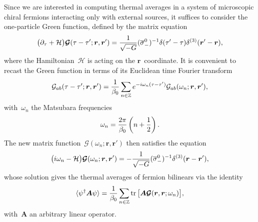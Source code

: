 \documentclass[11pt,a4paper]{article}
\begin{document}
Since we are interested in computing
thermal averages in a system of microscopic chiral fermions interacting only with external sources, 
it suffices to consider the one-particle Green function, defined by the matrix equation
\begin{align}
\big(\partial_{\tau}+\mathcal{H}\big)\boldsymbol{\mathcal{G}}(\tau-\tau';\boldsymbol{r},\boldsymbol{r}')=
{1\over \sqrt{-G}}(\overline{\sigma}_{-}^{0})^{-1}
\delta(\tau'-\tau)\delta^{(3)}(\boldsymbol{r}'-\boldsymbol{r}),
\label{eq:green_function_def}
\end{align}
where the Hamiltonian~$\mathcal{H}$ is acting on the $\boldsymbol{r}$~coordinate. 
It is convenient to recast the Green function in terms of 
its Euclidean time Fourier transform
\begin{align}
\mathcal{G}_{ab}(\tau-\tau';\boldsymbol{r},\boldsymbol{r}')
={1\over\beta_{0}}\sum_{n\in\mathbb{Z}}e^{-i\omega_{n}(\tau-\tau')}
\mathcal{G}_{ab}(\omega_{n};\boldsymbol{r},\boldsymbol{r}'),
\label{eq:green_function_time}
\end{align}
with~$\omega_{n}$ the Matsubara frequencies
\begin{align}
\omega_{n}={2\pi\over \beta_{0}}\left(n+{1\over 2}\right).
\label{eq:matsubara_freq}
\end{align}
The new matrix
function~$\boldsymbol{\mathcal{G}}(\omega_{n};\boldsymbol{r},\boldsymbol{r}')$ then satisfies the equation
\begin{align}
\big(i\omega_{n}-\mathcal{H}\big)\boldsymbol{\mathcal{G}}(\omega_{n};\boldsymbol{r},\boldsymbol{r}')
=-{1\over \sqrt{-G}}(\overline{\sigma}_{-}^{0})^{-1}\delta^{(3)}(\boldsymbol{r}-\boldsymbol{r}'),
\label{eq:GF_def_eom_frequencies1}
\end{align}
whose solution gives the
thermal averages of fermion bilinears via the identity~\cite{AGD,Fetter_Walecka,Bruus_Frensberg}
\begin{align}
\langle \psi^{\dagger}\boldsymbol{A}\psi\rangle
={1\over \beta_{0}}\sum_{n\in\mathbb{Z}}{\rm tr\,}\big[\boldsymbol{A}\boldsymbol{\mathcal{G}}(\boldsymbol{r},\boldsymbol{r};\omega_{n})\big],
\label{eq:thermal_average_GF}
\end{align}
with~$\boldsymbol{A}$ an arbitrary linear operator.
\end{document}
